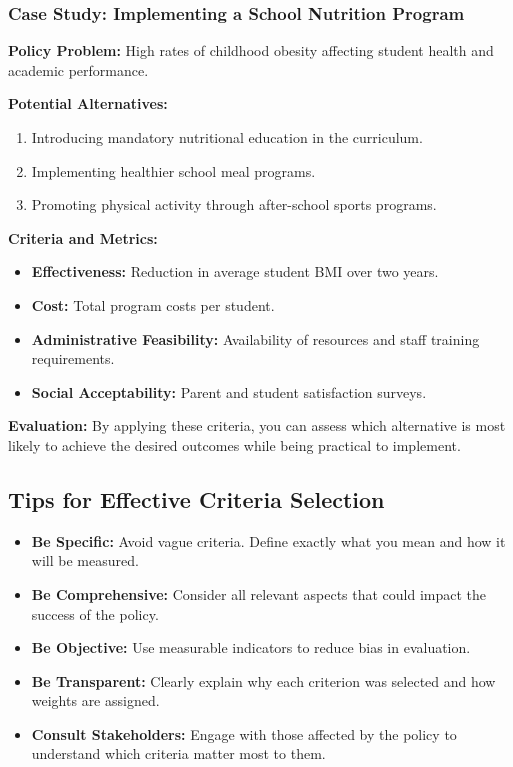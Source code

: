 \documentclass{article}
\theoremstyle{definition}
\theoremstyle{plain}
\begin{document}
\subsubsection{Case Study: Implementing a School Nutrition Program}

\textbf{Policy Problem:} High rates of childhood obesity affecting student health and academic performance.

\textbf{Potential Alternatives:}

\begin{enumerate}[label=\alph*.]
    \item Introducing mandatory nutritional education in the curriculum.
    \item Implementing healthier school meal programs.
    \item Promoting physical activity through after-school sports programs.
\end{enumerate}

\textbf{Criteria and Metrics:}

\begin{itemize}
    \item \textbf{Effectiveness:} Reduction in average student BMI over two years.
    \item \textbf{Cost:} Total program costs per student.
    \item \textbf{Administrative Feasibility:} Availability of resources and staff training requirements.
    \item \textbf{Social Acceptability:} Parent and student satisfaction surveys.
\end{itemize}

\textbf{Evaluation:} By applying these criteria, you can assess which alternative is most likely to achieve the desired outcomes while being practical to implement.

\subsection{Tips for Effective Criteria Selection}

\begin{itemize}
    \item \textbf{Be Specific:} Avoid vague criteria. Define exactly what you mean and how it will be measured.

    \item \textbf{Be Comprehensive:} Consider all relevant aspects that could impact the success of the policy.

    \item \textbf{Be Objective:} Use measurable indicators to reduce bias in evaluation.

    \item \textbf{Be Transparent:} Clearly explain why each criterion was selected and how weights are assigned.

    \item \textbf{Consult Stakeholders:} Engage with those affected by the policy to understand which criteria matter most to them.
\end{itemize}
\end{document}
